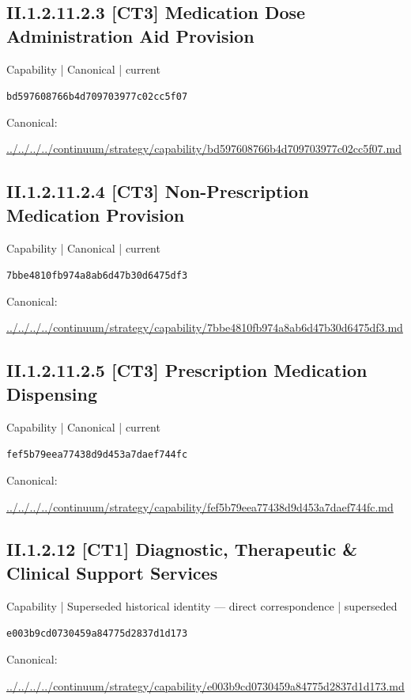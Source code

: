 \documentclass[10pt,a4paper]{article}
\begin{document}
\subsection*{II.1.2.11.2.3 [CT3] Medication Dose Administration Aid Provision}
{\small Capability | Canonical | current}\par
\texttt{bd597608766b4d709703977c02cc5f07}\par
Canonical: \par
{\footnotesize\url{../../../../continuum/strategy/capability/bd597608766b4d709703977c02cc5f07.md}}\par
\subsection*{II.1.2.11.2.4 [CT3] Non-Prescription Medication Provision}
{\small Capability | Canonical | current}\par
\texttt{7bbe4810fb974a8ab6d47b30d6475df3}\par
Canonical: \par
{\footnotesize\url{../../../../continuum/strategy/capability/7bbe4810fb974a8ab6d47b30d6475df3.md}}\par
\subsection*{II.1.2.11.2.5 [CT3] Prescription Medication Dispensing}
{\small Capability | Canonical | current}\par
\texttt{fef5b79eea77438d9d453a7daef744fc}\par
Canonical: \par
{\footnotesize\url{../../../../continuum/strategy/capability/fef5b79eea77438d9d453a7daef744fc.md}}\par
\subsection*{II.1.2.12 [CT1] Diagnostic, Therapeutic \& Clinical Support Services}
{\small Capability | Superseded historical identity — direct correspondence | superseded}\par
\texttt{e003b9cd0730459a84775d2837d1d173}\par
Canonical: \par
{\footnotesize\url{../../../../continuum/strategy/capability/e003b9cd0730459a84775d2837d1d173.md}}\par
\end{document}
